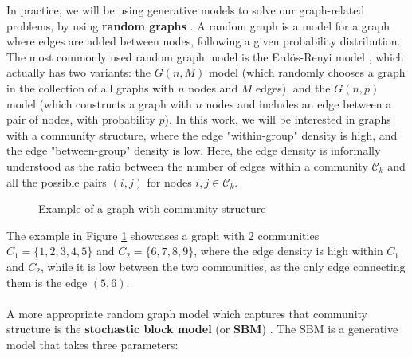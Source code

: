 \documentclass[12pt, oneside]{report}   	%
\begin{document}
In practice, we will be using generative models to solve our graph-related problems, by using \textbf{random graphs} \cite{bollobas1998random}. A random graph is a model for a graph where edges are added between nodes, following a given probability distribution. The most commonly used random graph model is the Erdös-Renyi model \cite{erdds1959random}, which actually has two variants: the $G(n,M)$ model (which randomly chooses a graph in the collection of all graphs with $n$ nodes and $M$ edges), and the $G(n,p)$ model (which constructs a graph with $n$ nodes and includes an edge between a pair of nodes, with probability $p$). In this work, we will be interested in graphs with a community structure, where the edge "within-group" density is high, and the edge "between-group" density is low. Here, the edge density is informally understood as the ratio between the number of edges within a community $\mathcal{C}_k$ and all the possible pairs $(i,j)$ for nodes $i,j\in\mathcal{C}_k$.
\begin{figure}[t]
\centering
{}
\caption{Example of a graph with community structure}
\label{fig:graph_comm}
\end{figure}
\noindent The example in Figure \ref{fig:graph_comm} showcases a graph with 2 communities $C_1=\{1,2,3,4,5\}$ and $C_2=\{6,7,8,9\}$, where the edge density is high within $C_1$ and $C_2$, while it is low between the two communities, as the only edge connecting them is the edge $(5,6)$.\\\\
A more appropriate random graph model which captures that community structure is the \textbf{stochastic block model} (or \textbf{SBM}) \cite{holland1983stochastic}. The SBM is a generative model that takes three parameters:
\end{document}
